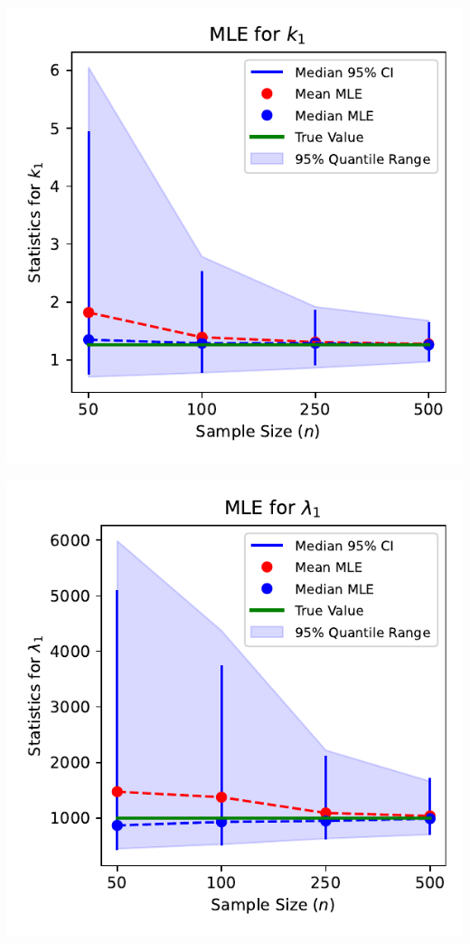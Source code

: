 \documentclass{article}
\begin{document}
\pagestyle{empty}

\noindent
\begin{minipage}[t]{0.475\textwidth}
  \centering
  \includegraphics[width=\textwidth,height=0.33\textheight,keepaspectratio]{plot-n-vs-shape.1-mle.pdf}
\end{minipage}%
\begin{minipage}[t]{0.475\textwidth}
  \centering
  \includegraphics[width=\textwidth,height=0.33\textheight,keepaspectratio]{plot-n-vs-scale.1-mle.pdf}
\end{minipage}
\end{document}
